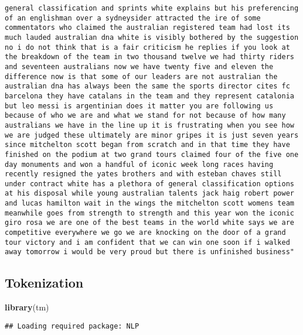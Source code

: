 \documentclass[]{article}
\newenvironment{Shaded}{\begin{snugshade}}{\end{snugshade}}
\newcommand{\KeywordTok}[1]{\textcolor[rgb]{0.13,0.29,0.53}{\textbf{#1}}}
\newcommand{\NormalTok}[1]{#1}
\begin{document}
\begin{verbatim}
general classification and sprints white explains but his preferencing of an englishman over a sydneysider attracted the ire of some commentators who claimed the australian registered team had lost its much lauded australian dna white is visibly bothered by the suggestion no i do not think that is a fair criticism he replies if you look at the breakdown of the team in two thousand twelve we had thirty riders and seventeen australians now we have twenty five and eleven the difference now is that some of our leaders are not australian the australian dna has always been the same the sports director cites fc barcelona they have catalans in the team and they represent catalonia but leo messi is argentinian does it matter you are following us because of who we are and what we stand for not because of how many australians we have in the line up it is frustrating when you see how we are judged these ultimately are minor gripes it is just seven years since mitchelton scott began from scratch and in that time they have finished on the podium at two grand tours claimed four of the five one day monuments and won a handful of iconic week long races having recently resigned the yates brothers and with esteban chaves still under contract white has a plethora of general classification options at his disposal while young australian talents jack haig robert power and lucas hamilton wait in the wings the mitchelton scott womens team meanwhile goes from strength to strength and this year won the iconic giro rosa we are one of the best teams in the world white says we are competitive everywhere we go we are knocking on the door of a grand tour victory and i am confident that we can win one soon if i walked away tomorrow i would be very proud but there is unfinished business"
\end{verbatim}

\subsection{Tokenization}\label{tokenization}

\begin{Shaded}
\begin{Highlighting}[]
\KeywordTok{library}\NormalTok{(tm)}
\end{Highlighting}
\end{Shaded}

\begin{verbatim}
## Loading required package: NLP
\end{verbatim}
\end{document}
